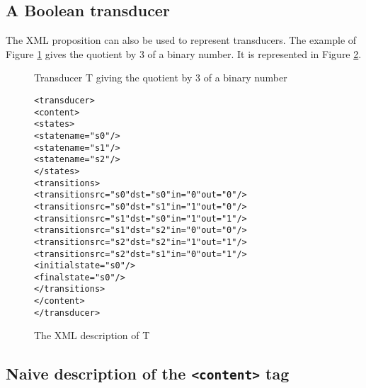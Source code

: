 \documentclass[a4paper]{article}
\def\contenttag{\texttt{<content>}}
\def\dstname{\texttt{dst}}
\def\srcname{\texttt{src}}
\begin{document}
\subsection{A Boolean transducer}

The XML proposition can also be used to represent transducers. The example of
Figure \ref{bindiv3} gives the quotient by 3 of a binary number. It is
represented in Figure \ref{bindiv3xml}.


\begin{figure}[h]
  \begin{center}
\caption{Transducer T giving the quotient by 3 of a binary number}
\label{bindiv3}
  \end{center}
\end{figure}

\small
\begin{figure}[h]
  \begin{center}
\begin{alltt}
<transducer>
  <content>
    <states>
       <state name="s0"/>
       <state name="s1"/>
       <state name="s2"/>
    </states>
    <transitions>
       <transition \srcname{}="s0" \dstname{}="s0" in="0" out="0"/>
       <transition \srcname{}="s0" \dstname{}="s1" in="1" out="0"/>
       <transition \srcname{}="s1" \dstname{}="s0" in="1" out="1"/>
       <transition \srcname{}="s1" \dstname{}="s2" in="0" out="0"/>
       <transition \srcname{}="s2" \dstname{}="s2" in="1" out="1"/>
       <transition \srcname{}="s2" \dstname{}="s1" in="0" out="1"/>
       <initial state="s0"/>
       <final state="s0"/>
    </transitions>
  </content>
</transducer>
\end{alltt}

\caption{The XML description of T}
\label{bindiv3xml}
  \end{center}
\end{figure}

\newpage
\subsection{Naive description of the \contenttag{} tag}
\end{document}
